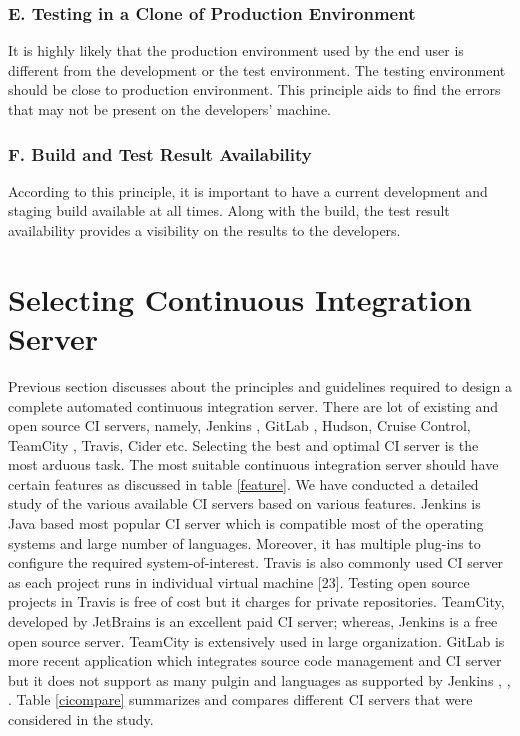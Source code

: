 \documentclass[10pt]{ruthesis}
\begin{document}
\subsubsection{\textbf{E. Testing in a Clone of Production Environment}}
It is highly likely that the production environment used by the end user is different from the development or the test environment. The testing environment should be close to production environment. This principle aids to find the errors that may not be present on the developers' machine. 

\subsubsection{\textbf{F. Build and Test Result Availability}}
According to this principle, it is important to have a current development and staging build available at all times. Along with the build, the test result availability provides a visibility on the results to the developers.




\section{Selecting Continuous Integration Server}
Previous section discusses about the principles and guidelines required to design a complete automated continuous integration server. There are lot of existing and open source CI servers, namely, Jenkins \cite{site5}, GitLab \cite{site6}, Hudson, Cruise Control, TeamCity \cite{site7}, Travis, Cider \cite{ref18} etc. Selecting the best and optimal CI server is the most arduous task. The most suitable continuous integration server should have certain features as discussed in table \ref{feature}. We have conducted a detailed study of the various available CI servers based on various features. Jenkins is Java based most popular CI server which is compatible most of the operating systems and large number of languages. Moreover, it has multiple plug-ins to configure the required system-of-interest. Travis is also commonly used CI server as each project runs in individual virtual machine [23]. Testing open source projects in Travis is free of cost but it charges for private repositories. TeamCity, developed by JetBrains is an excellent paid CI server; whereas, Jenkins is a free open source server. TeamCity is extensively used in large organization. GitLab is more recent application which integrates source code management and CI server but it does not support as many pulgin and languages as supported by Jenkins \cite{ref16}, \cite{ref17}, \cite{ref20}. Table \ref{cicompare} summarizes and compares different CI servers that were considered in the study.
\end{document}
